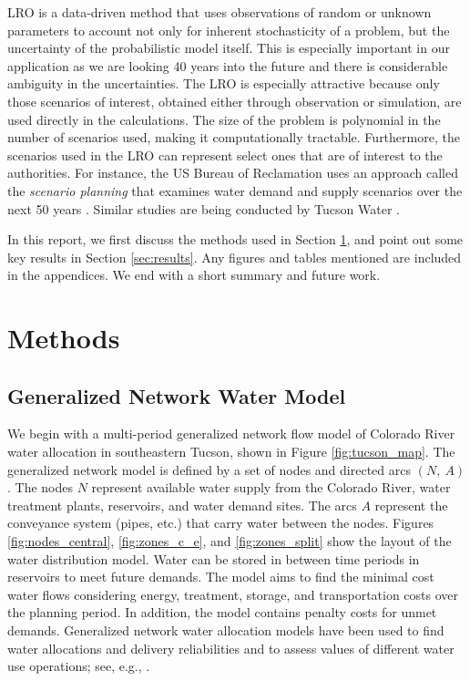 \documentclass[12pt]{amsart}
\begin{document}
LRO is a data-driven method that uses observations of random or unknown parameters to account not only for inherent stochasticity of a problem, but the uncertainty of the probabilistic model itself.
This is especially important in our application as we are looking 40 years into the future and there is considerable ambiguity in the uncertainties.
The LRO is especially attractive because only those scenarios of interest, obtained either through observation or simulation, are used directly in the calculations.
The size of the problem is polynomial in the number of scenarios used, making it computationally tractable.
Furthermore, the scenarios used in the LRO can represent select ones that are of interest to the authorities. 
For instance, the US Bureau of Reclamation uses an approach called the {\it scenario planning} that examines water demand and supply scenarios over the next 50 years \cite{usbr_11}.  
Similar studies are being conducted by Tucson Water  \cite{cityofTucsonWaterPlan}.

In this report, we first discuss the methods used in Section \ref{sec:methods}, and point out some key results in Section \ref{sec:results}.
Any figures and tables mentioned are included in the appendices.
We end with a short summary and future work.


\section{Methods}
\label{sec:methods}

\subsection{Generalized Network Water Model} 
\label{sec:network_model}

We begin with a multi-period generalized network flow model of Colorado River water allocation in southeastern Tucson, shown in Figure \ref{fig:tucson_map}.
The generalized network model is defined by a set of nodes and directed arcs $(N,\: A)$.
The nodes $N$ represent available water supply from the Colorado River, water treatment plants, reservoirs, and water demand sites.
The arcs $A$ represent the conveyance system (pipes, etc.) that carry water between the nodes.
Figures \ref{fig:nodes_central}, \ref{fig:zones_c_e}, and \ref{fig:zones_split} show the layout of the water distribution model.
Water can be stored in between time periods in reservoirs to meet future demands.
The model aims to find the minimal cost water flows considering energy, treatment, storage, and transportation costs over the planning period. 
In addition, the model contains penalty costs for unmet demands. 
Generalized network water allocation models have been used to find water allocations and delivery reliabilities and to assess values of different water use operations; see, e.g., \cite{draper_etal_03}. 
\end{document}
